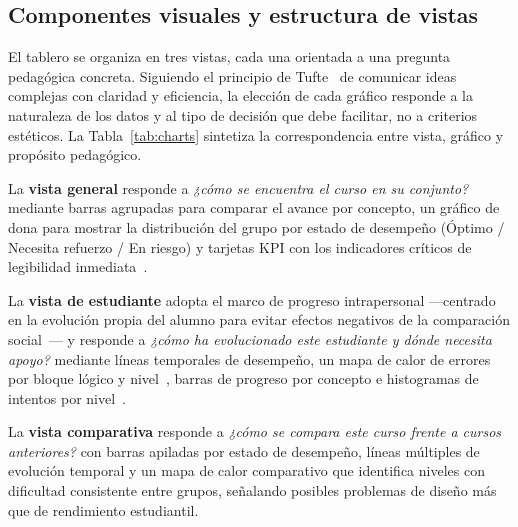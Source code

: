 \subsection{Componentes visuales y estructura de vistas}
\label{architectue:lad-view}

El tablero se organiza en tres vistas, cada una orientada a una pregunta
pedagógica concreta. Siguiendo el principio de Tufte~\cite{tufte2001} de
comunicar ideas complejas con claridad y eficiencia, la elección de cada
gráfico responde a la naturaleza de los datos y al tipo de decisión que debe
facilitar, no a criterios estéticos. La Tabla~\ref{tab:charts} sintetiza
la correspondencia entre vista, gráfico y propósito pedagógico.

La \textbf{vista general} responde a \textit{¿cómo se encuentra el curso en
	su conjunto?} mediante barras agrupadas para comparar el avance por concepto,
un gráfico de dona para mostrar la distribución del grupo por estado de
desempeño (Óptimo / Necesita refuerzo / En riesgo) y tarjetas KPI con los
indicadores críticos de legibilidad inmediata~\cite{ilearn2023,few2009}.

La \textbf{vista de estudiante} adopta el marco de progreso intrapersonal
—centrado en la evolución propia del alumno para evitar efectos negativos
de la comparación social~\cite{rahimi2021learning,susnjak_learning_2022}— y
responde a \textit{¿cómo ha evolucionado este estudiante y dónde necesita
	apoyo?} mediante líneas temporales de desempeño, un mapa de calor de errores
por bloque lógico y nivel~\cite{wilke2019}, barras de progreso por concepto
e histogramas de intentos por nivel~\cite{few2009}.

La \textbf{vista comparativa} responde a \textit{¿cómo se compara este curso
	frente a cursos anteriores?} con barras apiladas por estado de desempeño,
líneas múltiples de evolución temporal y un mapa de calor comparativo que
identifica niveles con dificultad consistente entre grupos, señalando posibles
problemas de diseño más que de rendimiento estudiantil.

